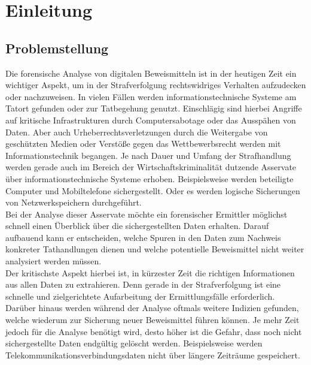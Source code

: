 
\chapter{Einleitung}
\label{ch:einleitung}

\section{Problemstellung}
Die forensische Analyse von digitalen Beweismitteln ist in der heutigen Zeit ein wichtiger Aspekt, um in der Strafverfolgung rechtswidriges Verhalten aufzudecken oder nachzuweisen. In vielen Fällen werden informationstechnische Systeme am Tatort gefunden oder zur Tatbegehung genutzt. Einschlägig sind hierbei Angriffe auf kritische Infrastrukturen durch Computersabotage oder das Ausspähen von Daten. Aber auch Urheberrechtsverletzungen durch die Weitergabe von geschützten Medien oder Verstöße gegen das Wettbewerbsrecht werden mit Informationstechnik begangen.
Je nach Dauer und Umfang der Strafhandlung werden gerade auch im Bereich der Wirtschaftskriminalität dutzende Asservate über informationstechnische Systeme erhoben. Beispielsweise werden beteiligte Computer und Mobiltelefone sichergestellt. Oder es werden logische Sicherungen von Netzwerkspeichern durchgeführt.\\

\noindent
Bei der Analyse dieser Asservate möchte ein forensischer Ermittler möglichst schnell einen Überblick über die sichergestellten Daten erhalten. Darauf aufbauend kann er entscheiden, welche Spuren in den Daten zum Nachweis konkreter Tathandlungen dienen und welche potentielle Beweismittel nicht weiter analysiert werden müssen.\\

\noindent
Der kritischste Aspekt hierbei ist, in kürzester Zeit die richtigen Informationen aus allen Daten zu extrahieren. Denn gerade in der Strafverfolgung ist eine schnelle und zielgerichtete Aufarbeitung der Ermittlungsfälle erforderlich. Darüber hinaus werden während der Analyse oftmals weitere Indizien gefunden, welche wiederum zur Sicherung neuer Beweismittel führen können. Je mehr Zeit jedoch für die Analyse benötigt wird, desto höher ist die Gefahr, dass noch nicht sichergestellte Daten endgültig gelöscht werden. Beispielsweise werden Telekommunikationsverbindungsdaten nicht über längere Zeiträume gespeichert.\\

